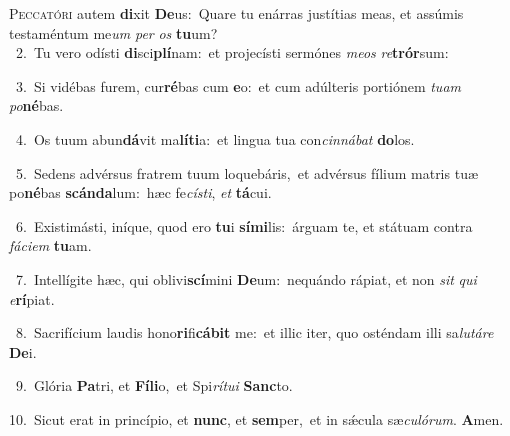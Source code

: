 \lettrine{\initial\textcolor{\initialcolor}{P}}{eccatóri} autem \textbf{di}\-xit \textbf{De}\-us:~\star Quare tu enárras justítias meas, et assúmis testaméntum me\textit{um} \textit{per} \textit{os} \textbf{tu}\-um?\\
{\numbfont\textcolor{\numbcolor}{~2.}}~Tu vero odísti \textbf{di}\-sci\-\textbf{plí}\-nam:~\star et projecísti sermónes \textit{me}\-\textit{os} \textit{re}\-\textbf{trór}sum:\par
{\numbfont\textcolor{\numbcolor}{~3.}}~Si vidébas furem, cur\-\textbf{ré}\-bas cum \textbf{e}\-o:~\star et cum adúlteris portiónem \textit{tu}\-\textit{am} \textit{po}\-\textbf{né}bas.\par
{\numbfont\textcolor{\numbcolor}{~4.}}~Os tuum abun\-\textbf{dá}\-vit ma\-\textbf{lí}\-\textbf{ti}a:~\star et lingua tua con\-\textit{cin}\-\textit{ná}\textit{bat} \textbf{do}\-los.\par
{\numbfont\textcolor{\numbcolor}{~5.}}~Sedens advérsus fratrem tuum loquebáris,~\dagger et advérsus fílium matris tuæ po\-\textbf{né}\-bas \textbf{scán}\-\textbf{da}lum:~\star hæc fe\-\textit{cís}\-\textit{ti}, \textit{et} \textbf{tá}\-cui.\par
{\numbfont\textcolor{\numbcolor}{~6.}}~Existimásti, iníque, quod ero \textbf{tu}\-i \textbf{sí}\-\textbf{mi}lis:~\star árguam te, et státuam contra \textit{fá}\-\textit{ci}\textit{em} \textbf{tu}\-am.\par
{\numbfont\textcolor{\numbcolor}{~7.}}~Intellígite hæc, qui oblivi\-\textbf{scí}\-mini \textbf{De}\-um:~\star nequándo rápiat, et non \textit{sit} \textit{qui} \textit{e}\-\textbf{rí}piat.\par
{\numbfont\textcolor{\numbcolor}{~8.}}~Sacrifícium laudis hono\-\textbf{ri}\-fi\-\textbf{cá}\-\textbf{bit} me:~\star et illic iter, quo osténdam illi sa\-\textit{lu}\-\textit{tá}\textit{re} \textbf{De}\-i.\par
{\numbfont\textcolor{\numbcolor}{~9.}}~Glória \textbf{Pa}\-tri, et \textbf{Fí}\-\textbf{li}o,~\star et Spi\-\textit{rí}\-\textit{tu}\textit{i} \textbf{Sanc}\-to.\par
{\numbfont\textcolor{\numbcolor}{10.}}~Sicut erat in princípio, et \textbf{nunc}\-, et \textbf{sem}\-per,~\star et in sǽcula sæ\-\textit{cu}\-\textit{ló}\textit{rum}. \textbf{A}\-men.\par
